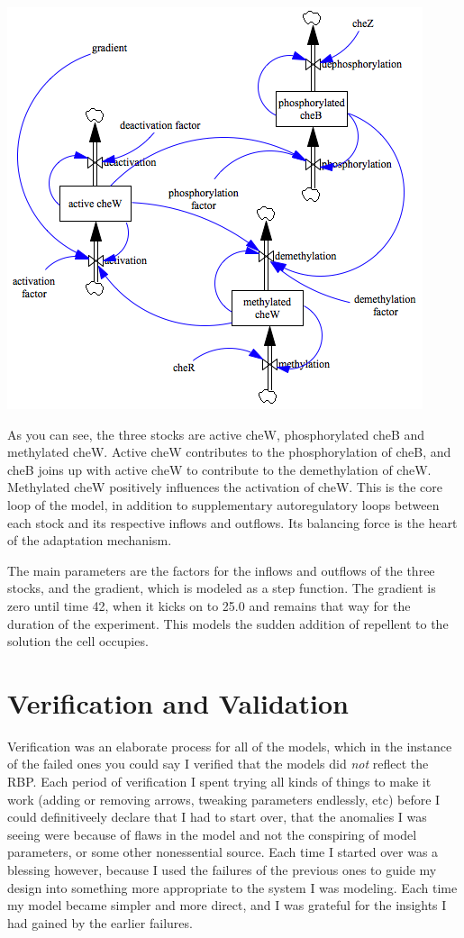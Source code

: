 \documentclass[12pt]{article}
\begin{document}
\includegraphics[scale=0.8]{autoregulation.png}

As you can see, the three stocks are active cheW, phosphorylated cheB and methylated cheW.  Active cheW contributes to the phosphorylation of cheB, and cheB joins up with active cheW to contribute to the demethylation of cheW.  Methylated cheW positively influences the activation of cheW.  This is the core loop of the model, in addition to supplementary autoregulatory loops between each stock and its respective inflows and outflows.   Its balancing force is the heart of the adaptation mechanism.

The main parameters are the factors for the inflows and outflows of the three stocks, and the gradient, which is modeled as a step function.  The gradient is zero until time 42, when it kicks on to 25.0 and remains that way for the duration of the experiment.  This models the sudden addition of repellent to the solution the cell occupies.  

\section{Verification and Validation}

Verification was an elaborate process for all of the models, which in the instance of the failed ones you could say I verified that the models did {\em not} reflect the RBP.  Each period of verification I spent trying all kinds of things to make it work (adding or removing arrows, tweaking parameters endlessly, etc) before I could definitiveely declare that I had to start over, that the anomalies I was seeing were because of flaws in the model and not the conspiring of model parameters, or some other nonessential source.  Each time I started over was a blessing however, because I used the failures of the previous ones to guide my design into something more appropriate to the system I was modeling. Each time my model became simpler and more direct, and I was grateful for the insights I had gained by the earlier failures.   
\end{document}
